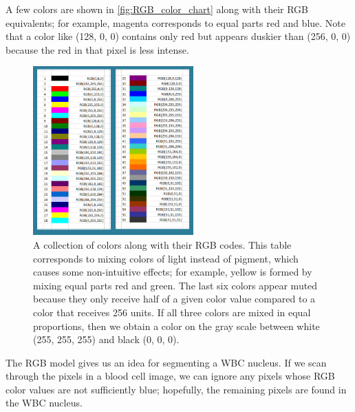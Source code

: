 A few colors are shown in \autoref{fig:RGB_color_chart} along with their RGB equivalents; for example, magenta corresponds to equal parts red and blue. Note that a color like (128, 0, 0) contains only red but appears duskier than (256, 0, 0) because the red in that pixel is less intense.\\

\begin{figure}[h]
\centering
\mySfFamily
\includegraphics[width = 0.55\textwidth]{../images/RGB_color_chart.png}
\caption{A collection of colors along with their RGB codes. This table corresponds to mixing colors of light instead of pigment, which causes some non-intuitive effects; for example, yellow is formed by mixing equal parts red and green. The last six colors appear muted because they only receive half of a given color value compared to a color that receives 256 units. If all three colors are mixed in equal proportions, then we obtain a color on the gray scale between white (255, 255, 255) and black (0, 0, 0).}
\label{fig:RGB_color_chart}
\end{figure}

The RGB model gives us an idea for segmenting a WBC nucleus. If we scan through the pixels in a blood cell image, we can ignore any pixels whose RGB color values are not sufficiently blue; hopefully, the remaining pixels are found in the WBC nucleus.\\

\begin{qbox}\end{qbox}

